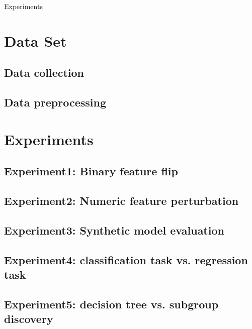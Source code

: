 Experiments


\section{Data Set}


\subsection{Data collection}

\subsection{Data preprocessing}


\section{Experiments}

\subsection{Experiment1: Binary feature flip}

\subsection{Experiment2: Numeric feature perturbation}

\subsection{Experiment3: Synthetic model evaluation}

\subsection{Experiment4: classification task vs. regression task}

\subsection{Experiment5: decision tree vs. subgroup discovery}
